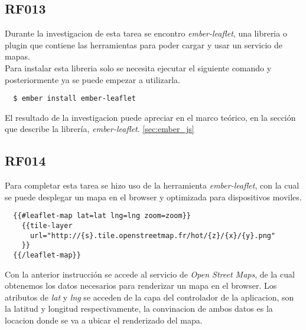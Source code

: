 \subsection{RF013}
\label{sub:RF013}

Durante la investigacion de esta tarea se encontro \emph{ember-leaflet}, una libreria o plugin que contiene las herramientas para poder cargar y usar un servicio de mapas.\\

Para instalar esta libreria solo se necesita ejecutar el siguiente comando y posteriormente ya se puede empezar a utilizarla.\\

\begin{verbatim}
  $ ember install ember-leaflet
\end{verbatim}

El resultado de la investigacion puede apreciar en el marco teórico, en la sección que describe la librería, \emph{ember-leaflet}. \ref{sec:ember_js}

\subsection{RF014}
\label{sub:RF014}


Para completar esta tarea se hizo uso de la herramienta \emph{ember-leaflet}, con la cual se puede desplegar un mapa en el browser y optimizada para dispositivos moviles.\\

\begin{verbatim}
  {{#leaflet-map lat=lat lng=lng zoom=zoom}}
    {{tile-layer
      url="http://{s}.tile.openstreetmap.fr/hot/{z}/{x}/{y}.png"
    }}
  {{/leaflet-map}}
\end{verbatim}

Con la anterior instrucción se accede al servicio de \emph{Open Street Maps}, de la cual obtenemos los datos necesarios para renderizar un mapa en el browser. Los atributos de \emph{lat} y \emph{lng} se acceden de la capa del controlador de la aplicacion, son la latitud y longitud respectivamente, la convinacion de ambos datos es la locacion donde se va a ubicar el renderizado del mapa.\\

%

